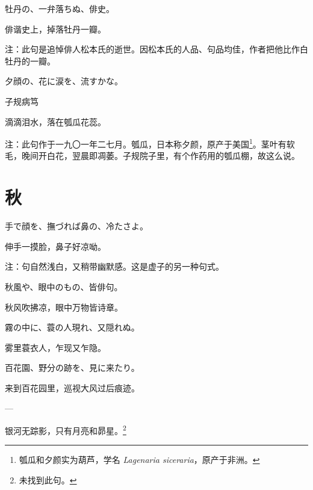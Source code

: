 \begin{haiku}
    {\FH 牡丹の、一弁落ちぬ、俳史。}

    {\FK 俳谐史上，掉落牡丹一瓣。}

    {\FT 注：此句是追悼俳人松本氏的逝世。因松本氏的人品、句品均佳，作者把他比作白牡丹的一瓣。}
\end{haiku}

\begin{haiku}
    {\FH 夕顔の、花に涙を、流すかな。}

    {\FK 子规病笃}

    {\FK 滴滴泪水，落在瓠瓜花蕊。}

    {\FT 注：此句作于一九〇一年二七月。瓠瓜，日本称夕颜，原产于美国\footnote{{\FT 瓠瓜和夕颜实为葫芦，学名} \textit{Lagenaria siceraria}{\FT ，原产于非洲。}}。茎叶有软毛，晚间开白花，翌晨即凋萎。子规院子里，有个作药用的瓠瓜棚，故这么说。}
\end{haiku}

\section{\FK 秋}

\setcounter{haikucounter}{0}

\begin{haiku}
    {\FH 手で顔を、撫づれば鼻の、冷たさよ。}

    {\FK 伸手一摸脸，鼻子好凉呦。}

    {\FT 注：句自然浅白，又稍带幽默感。这是虚子的另一种句式。}
\end{haiku}

\begin{haiku}
    {\FH 秋風や、眼中のもの、皆俳句。}

    {\FK 秋风吹拂凉，眼中万物皆诗章。}
\end{haiku}

\begin{haiku}
    {\FH 霧の中に、蓑の人現れ、又隠れぬ。}

    {\FK 雾里蓑衣人，乍现又乍隐。}
\end{haiku}

\begin{haiku}
    {\FH 百花園、野分の跡を、見に来たり。}

    {\FK 来到百花园里，巡视大风过后痕迹。}
\end{haiku}

\begin{haiku}
    {\FH ---}

    {\FK 银河无踪影，只有月亮和昴星。\footnote{\FT 未找到此句。}}
\end{haiku}

